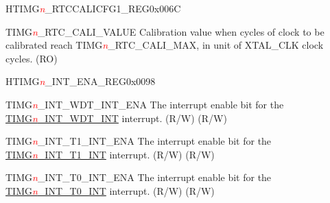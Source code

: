 \begin{register}{H}{TIMG\textcolor{red}{\it{n}}\_RTCCALICFG1\_REG}{0x006C}\label{regdesc:TIMGRTCCALICFG1REG}
%
%
\regnewline%
\begin{regdesc}\begin{reglist}
\label{fielddesc:TIMGRTCCALIVALUE}\item [TIMG\textcolor{red}{\it{n}}\_RTC\_CALI\_VALUE] Calibration value when cycles of clock to be calibrated reach TIMG\textcolor{red}{\it{n}}\_RTC\_CALI\_MAX, in unit of XTAL\_CLK clock cycles. (RO)
\end{reglist}\end{regdesc}
\end{register}

\begin{register}{H}{TIMG\textcolor{red}{\it{n}}\_INT\_ENA\_REG}{0x0098}\label{regdesc:TIMERSINTENAREG}
%
%
%
%
\regnewline%
\begin{regdesc}\begin{reglist}
\item [TIMG\textcolor{red}{\it{n}}\_INT\_WDT\_INT\_ENA]The interrupt enable bit for the \hyperref[int:TIMERSINTWDTINT]{TIMG\textcolor{red}{\it{n}}\_INT\_WDT\_INT} interrupt. (R/W) (R/W)
\item [TIMG\textcolor{red}{\it{n}}\_INT\_T1\_INT\_ENA]The interrupt enable bit for the \hyperref[int:TIMERSINTT1INT]{TIMG\textcolor{red}{\it{n}}\_INT\_T1\_INT} interrupt. (R/W) (R/W)
\item [TIMG\textcolor{red}{\it{n}}\_INT\_T0\_INT\_ENA]The interrupt enable bit for the \hyperref[int:TIMERSINTT0INT]{TIMG\textcolor{red}{\it{n}}\_INT\_T0\_INT} interrupt. (R/W) (R/W)
\end{reglist}\end{regdesc}
\end{register}


